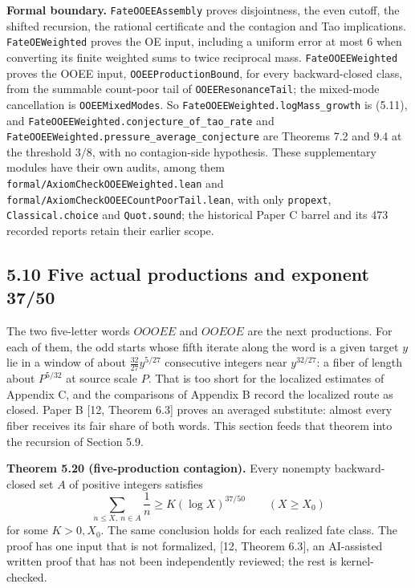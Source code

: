 \documentclass[11pt,a4paper]{article}
\begin{document}
\textbf{Formal boundary.} \texttt{\nolinkurl{FateOOEEAssembly}} proves
disjointness, the even cutoff, the shifted recursion, the rational
certificate and the contagion and Tao implications.
\texttt{\nolinkurl{FateOEWeighted}} proves the OE input, including a
uniform error at most 6 when converting its finite weighted sums to
twice reciprocal mass. \texttt{\nolinkurl{FateOOEEWeighted}} proves the
OOEE input, \texttt{\nolinkurl{OOEEProductionBound}}, for every
backward-closed class, from the summable count-poor tail of
\texttt{\nolinkurl{OOEEResonanceTail}}; the mixed-mode cancellation is
\texttt{\nolinkurl{OOEEMixedModes}}. So
\texttt{\nolinkurl{FateOOEEWeighted.logMass_growth}} is (5.11), and
\texttt{\nolinkurl{FateOOEEWeighted.conjecture_of_tao_rate}} and
\texttt{\nolinkurl{FateOOEEWeighted.pressure_average_conjecture}} are
Theorems 7.2 and 9.4 at the threshold \(3/8\), with no contagion-side
hypothesis. These supplementary modules have their own audits, among
them \texttt{\nolinkurl{formal/AxiomCheckOOEEWeighted.lean}} and
\texttt{\nolinkurl{formal/AxiomCheckOOEECountPoorTail.lean}}, with only
\texttt{\nolinkurl{propext}}, \texttt{\nolinkurl{Classical.choice}} and
\texttt{\nolinkurl{Quot.sound}}; the historical Paper C barrel and its
473 recorded reports retain their earlier scope.

\subsection{5.10 Five actual productions and exponent
37/50}\label{five-actual-productions-and-exponent-3750}

The two five-letter words \(OOOEE\) and \(OOEOE\) are the next
productions. For each of them, the odd starts whose fifth iterate along
the word is a given target \(y\) lie in a window of about
\(\tfrac{32}{27}y^{5/27}\) consecutive integers near \(y^{32/27}\): a
fiber of length about \(P^{5/32}\) at source scale \(P\). That is too
short for the localized estimates of Appendix C, and the comparisons of
Appendix B record the localized route as closed. Paper B {[}12, Theorem
6.3{]} proves an averaged substitute: almost every fiber receives its
fair share of both words. This section feeds that theorem into the
recursion of Section 5.9.

\textbf{Theorem 5.20 (five-production contagion).} Every nonempty
backward-closed set \(A\) of positive integers satisfies \[
\sum_{n\le X,\ n\in A}\frac1n\ge K(\log X)^{37/50}
\qquad(X\ge X_0)
\tag{5.14}
\] for some \(K>0,X_0\). The same conclusion holds for each realized
fate class. The proof has one input that is not formalized, {[}12,
Theorem 6.3{]}, an AI-assisted written proof that has not been
independently reviewed; the rest is kernel-checked.
\end{document}
